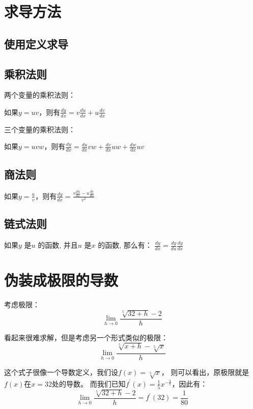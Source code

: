 \documentclass[11pt, b5paper, oneside]{book}
\begin{document}
\section{求导方法}

\subsection{使用定义求导}

\subsection{乘积法则}
两个变量的乘积法则：
\begin{center}
    如果$y=uv$，则有$\frac{dy}{dx}=v\frac{du}{dx}+u\frac{dv}{dx}$
\end{center}

三个变量的乘积法则：
\begin{center}
    如果$y=uvw$，则有$\frac{dy}{dx}=\frac{du}{dx}vw+\frac{dv}{dx}uw+\frac{dw}{dx}uv$
\end{center}

\subsection{商法则}
\begin{center}
    如果$y=\frac{u}{v}$，则有$\frac{dy}{dx}=\frac{v\frac{du}{dx}-u\frac{dv}{dx}}{v^2}$
\end{center}

\subsection{链式法则}
\begin{center}
    如果$y$ 是$u$ 的函数, 并且$u$ 是$x$ 的函数, 那么有：
    $\frac{dy}{dx}=\frac{dy}{du}\frac{dy}{dx}$
\end{center}

\section{伪装成极限的导数}

考虑极限：
\[\lim\limits_{h\to 0}\frac{\sqrt[5]{32+h}-2}{h}\]

看起来很难求解，但是考虑另一个形式类似的极限：
\[\lim\limits_{h\to 0}\frac{\sqrt[5]{x+h}-\sqrt[5]{x}}{h}\]

这个式子很像一个导数定义，我们设$f(x)=\sqrt[5]{x}$，
则可以看出，原极限就是$f(x)$在$x=32$处的导数。
而我们已知$f^{'}(x)=\frac{1}{5}x^{-\frac{4}{5}}$，因此有：
\[\lim\limits_{h\to 0}\frac{\sqrt[5]{32+h}-2}{h}=f^{'}(32)=\frac{1}{80}\]
\end{document}
